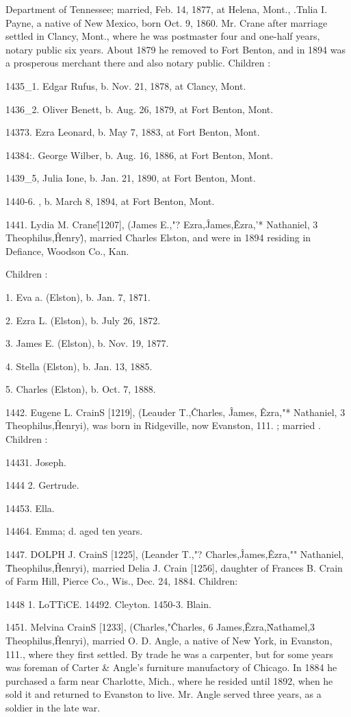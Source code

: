 Department of Tennessee; married, Feb. 14, 1877, at Helena, 
Mont., .Tnlia I. Payne, a native of New Mexico, born Oct. 9, 
1860. Mr. Crane after marriage settled in Clancy, Mont., where 
he was postmaster four and one-half years, notary public six 
years. About 1879 he removed to Fort Benton, and in 1894 was 
a prosperous merchant there and also notary public. Children : 

1435\_1. Edgar Rufus, b. Nov. 21, 1878, at Clancy, Mont. 

1436\_2. Oliver Benett, b. Aug. 26, 1879, at Fort Benton, Mont. 

14373. Ezra Leonard, b. May 7, 1883, at Fort Benton, Mont. 

14384:. George Wilber, b. Aug. 16, 1886, at Fort Benton, Mont. 

1439\_5, Julia Ione, b. Jan. 21, 1890, at Fort Benton, Mont. 

1440-6. , b. March 8, 1894, at Fort Benton, Mont. 

1441. Lydia M. Crane\^ [1207], (James E.,"? Ezra,\^ James,\^ 
Ezra,'* Nathaniel, 3 Theophilus,\^ Henry\^), married Charles Elston, 
and were in 1894 residing in Defiance, Woodson Co., Kan. 

Children : 

1. Eva a. (Elston), b. Jan. 7, 1871. 

2. Ezra L. (Elston), b. July 26, 1872. 

3. James E. (Elston), b. Nov. 19, 1877. 

4. Stella (Elston), b. Jan. 13, 1885. 

5. Charles (Elston), b. Oct. 7, 1888. 

1442. Eugene L. CrainS [1219], (Leauder T.,\^ Charles, \^ 
James, \^ Ezra,"* Nathaniel, 3 Theophilus,\^ Henryi), was born in 
Ridgeville, now Evanston, 111. ; married . Children : 

14431. Joseph. 

1444  2. Gertrude. 

14453. Ella. 

14464. Emma; d. aged ten years. 

1447. DOLPH J. CrainS [1225], (Leander T.,"? Charles,\^ 
James,\^ Ezra,"" Nathaniel, \^ Theophilus,\^ Henryi), married Delia 
J. Crain [1256], daughter of Frances B. Crain of Farm Hill, 
Pierce Co., Wis., Dec. 24, 1884. Children: 

1448  1. LoTTiCE. 
14492. Cleyton. 
1450-3. Blain. 

1451. Melvina CrainS [1233], (Charles,"\^ Charles, 6 James,\^ 
Ezra,\^ Nathamel,3 Theophilus,\^ Henryi), married O. D. Angle, 
a native of New York, in Evanston, 111., where they first settled. 
By trade he was a carpenter, but for some years was foreman 
of Carter \& Angle's furniture manufactory of Chicago. In 1884 
he purchased a farm near Charlotte, Mich., where he resided 
until 1892, when he sold it and returned to Evanston to live. 
Mr. Angle served three years, as a soldier in the late war. 

